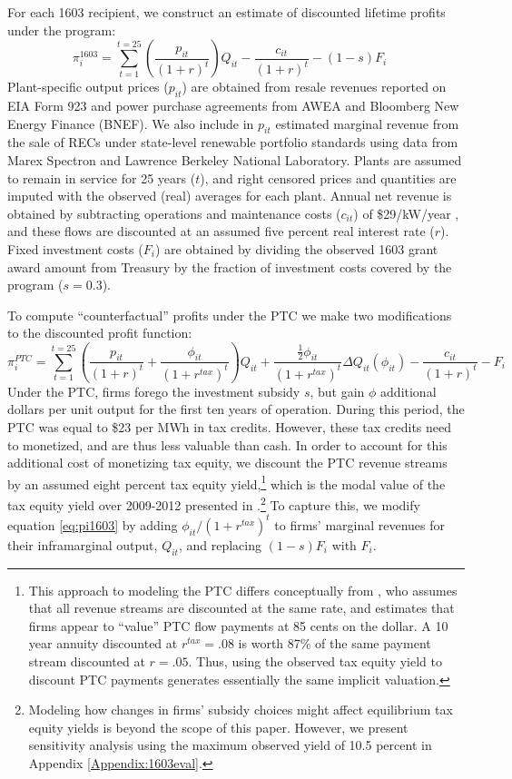 \documentclass[12pt]{article}
\begin{document}
For each 1603 recipient, we construct an estimate of discounted lifetime profits under the program:
\begin{equation}
\pi_i^{1603}=\sum_{t=1}^{t=25} \left(\frac{p_{it}}{(1+r)^{t}}\right) Q_{it} - \frac{c_{it}}{(1+r)^{t}} -(1-s)F_i\label{eq:pi1603} \quad
\end{equation}
Plant-specific output prices ($p_{it}$) are obtained from resale revenues reported on EIA Form 923 and power purchase agreements from AWEA and Bloomberg New Energy Finance (BNEF). We also include in $p_{it}$ estimated marginal revenue from the sale of RECs under state-level renewable portfolio standards using data from Marex Spectron and Lawrence Berkeley National Laboratory. Plants are assumed to remain in service for 25 years ($t$), and right censored prices and quantities are imputed with the observed (real) averages for each plant. Annual net revenue is obtained by subtracting operations and maintenance costs ($c_{it}$) of \$29/kW/year \citep{wiser_2018_2019}, and these flows are discounted at an assumed five percent real interest rate ($r$). Fixed investment costs ($F_i$) are obtained by dividing the observed 1603 grant award amount from Treasury by the fraction of investment costs covered by the program ($s=0.3$).

To compute ``counterfactual'' profits under the PTC we make two modifications to the discounted profit function:
\begin{equation}
\pi_i^{PTC}=\sum_{t=1}^{t=25}\left(\frac{p_{it}}{(1+r)^t} + \frac{\phi_{it}}{(1+r^{tax})^t} \right) Q_{it} 
 + \frac{\frac{1}{2} \phi_{it}}{(1+r^{tax})^t} \Delta Q_{it}(\phi_{it})
 - \frac{c_{it}}{(1+r)^t} - F_i\label{eq:piPTC}
\end{equation}
Under the PTC, firms forego the investment subsidy $s$, but gain $\phi$ additional dollars per unit output for the first ten years of operation. During this period, the PTC was equal to \$23 per MWh in tax credits. However, these tax credits need to monetized, and are thus less valuable than cash. In order to account for this additional cost of monetizing tax equity, we discount the PTC revenue streams by an assumed eight percent tax equity yield,\footnote{This approach to modeling the PTC differs conceptually from \cite{johnston_nonrefundable_2019}, who assumes that all revenue streams are discounted at the same rate, and estimates that firms appear to ``value'' PTC flow payments at 85 cents on the dollar. A 10 year annuity discounted at $r^{tax} = .08$ is worth 87\% of the same payment stream discounted at $r=.05$. Thus, using the observed tax equity yield to discount PTC payments generates essentially the same implicit valuation.} which is the modal value of the tax equity yield over 2009-2012 presented in \citet{bolinger_analysis_2014}.\footnote{Modeling how changes in firms' subsidy choices might affect equilibrium tax equity yields is beyond the scope of this paper. However, we present sensitivity analysis using the maximum observed yield of 10.5 percent in Appendix \ref{Appendix:1603eval}.} To capture this, we modify equation \ref{eq:pi1603} by adding $\phi_{it} / (1+r^{tax})^t$ to firms' marginal revenues for their inframarginal output, $Q_{it}$, and replacing $(1-s)F_i$ with $F_i$. 
\end{document}
